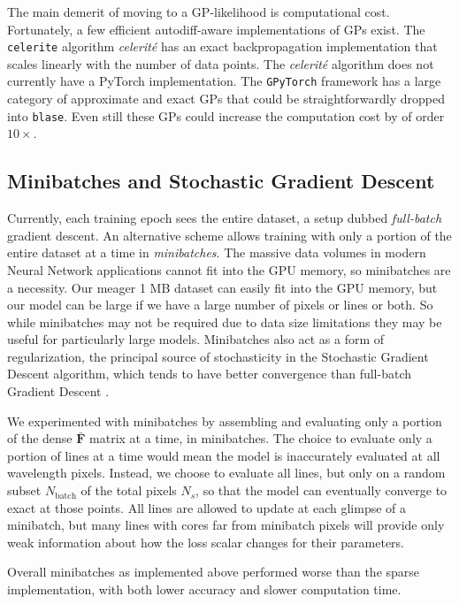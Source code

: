 \documentclass[twocolumn]{aastex631}
\begin{document}
The main demerit of moving to a GP-likelihood is computational cost. Fortunately, a few efficient autodiff-aware implementations of GPs exist. The \texttt{celerite} algorithm \emph{celerit\'e} \citep{2017AJ....154..220F} has an exact backpropagation implementation \citep{2018RNAAS...2...31F} that scales linearly with the number of data points. The \emph{celerit\'e} algorithm does not currently have a PyTorch implementation. The \texttt{GPyTorch} framework \citep{2018arXiv180911165G} has a large category of approximate and exact GPs that could be straightforwardly dropped into \texttt{blase}. Even still these GPs could increase the computation cost by of order $10\times$.


\subsection{Minibatches and Stochastic Gradient Descent}\label{minibatches}

Currently, each training epoch sees the entire dataset, a setup dubbed \emph{full-batch} gradient descent.
An alternative scheme allows training with only a portion of the entire dataset at a time in \emph{minibatches}. The massive data volumes in modern Neural Network applications cannot fit into the GPU memory, so minibatches are a necessity. Our meager 1 MB dataset can easily fit into the GPU memory, but our model can be large if we have a large number of pixels or lines or both.
So while minibatches may not be required due to data size limitations they may be useful for particularly large models.
Minibatches also act as a form of regularization, the principal source of stochasticity in the Stochastic Gradient Descent algorithm, which tends to have better convergence than full-batch Gradient Descent \citep{2016arXiv160904747R}.

We experimented with minibatches by assembling and evaluating only a portion of the dense $\bar{\bm{F}}$ matrix at a time, in minibatches. The choice to evaluate only a portion of lines at a time would mean the model is inaccurately evaluated at all wavelength pixels. Instead, we choose to evaluate all lines, but only on a random subset $N_{\mathrm{batch}}$ of the total pixels $N_s$, so that the model can eventually converge to exact at those points. All lines are allowed to update at each glimpse of a minibatch, but many lines with cores far from minibatch pixels will provide only weak information about how the loss scalar changes for their parameters.

Overall minibatches as implemented above performed worse than the sparse implementation, with both lower accuracy and slower computation time.
\end{document}
